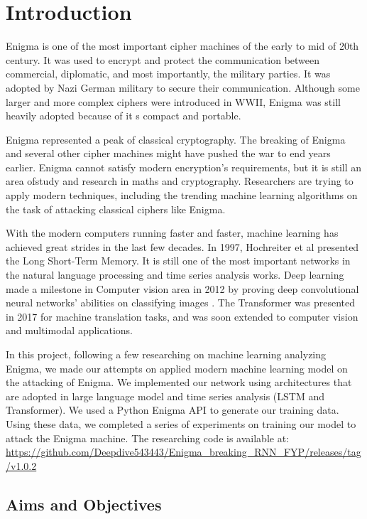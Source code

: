 \chapter{Introduction}

Enigma is one of the most important cipher machines of the early to mid of 20th century. It was used to encrypt and protect the communication between commercial, diplomatic, and most importantly, the military parties. It was adopted by Nazi German military to secure their communication. Although some larger and more complex ciphers were introduced in WWII, Enigma was still heavily adopted because of it s compact and portable.

Enigma represented a peak of classical cryptography. The breaking of Enigma and several other cipher machines might have pushed the war to end years earlier. Enigma cannot satisfy modern encryption’s requirements, but it is still an area ofstudy and research in maths and cryptography. Researchers are trying to apply modern techniques, including the trending machine learning algorithms on the task of attacking classical ciphers like Enigma. 

With the modern computers running faster and faster, machine learning has achieved great strides in the last few decades. In 1997, Hochreiter et al \cite{hochreiter1997long} presented the Long Short-Term Memory. It is still one of the most important networks in the natural language processing and time series analysis works. Deep learning made a milestone in Computer vision area in 2012 by proving deep convolutional neural networks' abilities on classifying images \cite{krizhevsky2012imagenet}. The Transformer \cite{vaswani2017attention} was presented in 2017 for machine translation tasks, and was soon extended to computer vision and multimodal applications. 

In this project, following a few researching on machine learning analyzing Enigma, we made our attempts on applied modern machine learning model on the attacking of Enigma. We implemented our network using architectures that are adopted in large language model and time series analysis (LSTM and Transformer). We used a Python Enigma API to generate our training data. Using these data, we completed a series of experiments on training our model to attack the Enigma machine. The researching code is available at: 
\url{https://github.com/Deepdive543443/Enigma_breaking_RNN_FYP/releases/tag/v1.0.2}


\section{Aims and Objectives}

